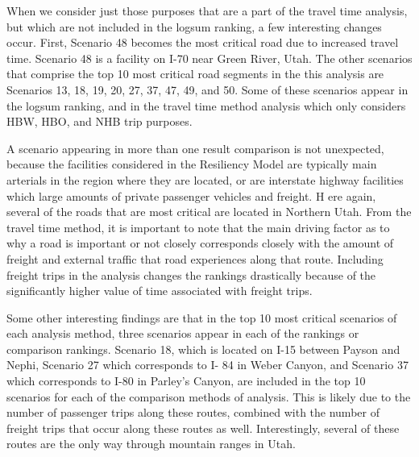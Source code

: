 When we consider just those purposes that are a part of the travel time analysis,
but which are not included in the logsum ranking, a few interesting changes occur.
First, Scenario 48 becomes the most critical road due to increased travel time.
Scenario 48 is a facility on I-70 near Green River, Utah.
The other scenarios that comprise the top 10 most critical road segments
in the this analysis are Scenarios 13, 18, 19, 20, 27, 37, 47, 49, and 50. Some
of these scenarios appear in the logsum ranking, and in the travel time method
analysis which only considers HBW, HBO, and NHB trip purposes.

A scenario appearing in more than one result comparison is not unexpected,
because the facilities considered in the Resiliency Model are typically main
arterials in the region where they are located, or are interstate highway
facilities which large amounts of private passenger vehicles and freight.
H ere again, several of the roads that are most critical are located in
Northern Utah. From the travel time method, it is important to note that the main driving factor as to
why a road is important or not closely corresponds closely with
the amount of
freight and external traffic that road experiences along that route. Including freight
trips in the analysis changes the rankings
drastically because of the significantly higher value of time associated
with freight trips.

Some other interesting findings are that in the top 10 most critical scenarios of each analysis
method, three scenarios appear in each of the rankings or comparison rankings. Scenario 18, which is located on
I-15 between Payson and Nephi, Scenario 27 which corresponds to I-
84 in Weber Canyon, and Scenario 37 which corresponds to I-80 in Parley’s Canyon,
are included in the
top 10 scenarios for each of the comparison methods of analysis. This is likely due to the
number of passenger trips along these routes, combined with the number of freight
trips that occur along these routes as well. Interestingly, several of these routes are
the only way through mountain ranges in Utah.

